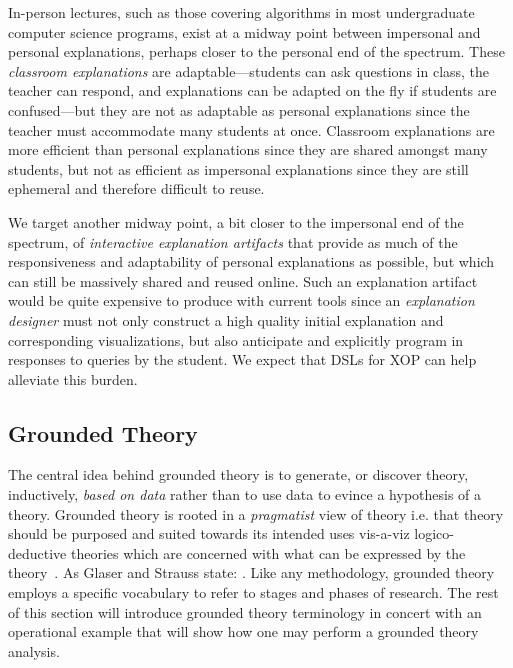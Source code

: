\documentclass[sigconf]{acmart}
\begin{document}
In-person lectures, such as those covering algorithms in most undergraduate
computer science programs, exist at a midway point between impersonal and
personal explanations, perhaps closer to the personal end of the spectrum.
These \emph{classroom explanations} are adaptable---students can ask questions
in class, the teacher can respond, and explanations can be adapted on the fly
if students are confused---but they are not as adaptable as personal
explanations since the teacher must accommodate many students at once.
Classroom explanations are more efficient than personal explanations since they
are shared amongst many students, but not as efficient as impersonal
explanations since they are still ephemeral and therefore difficult to reuse.


We target another midway point, a bit closer to the impersonal end of the
spectrum, of \emph{interactive explanation artifacts} that provide as much of
the responsiveness and adaptability of personal explanations as possible, but
which can still be massively shared and reused online. Such an explanation
artifact would be quite expensive to produce with current tools since an
\emph{explanation designer} must not only construct a high quality initial
explanation and corresponding visualizations, but also anticipate and
explicitly program in responses to queries by the student.
%
We expect that DSLs for XOP can help alleviate this burden.





\subsection{Grounded Theory}
\label{sec:back:gt}
The central idea behind grounded theory is to generate, or discover theory,
inductively, \emph{based on data} rather than to use data to evince a hypothesis
of a theory. Grounded theory is rooted in a \emph{pragmatist} view of theory
i.e. that theory should be purposed and suited towards its intended uses
vis-a-viz logico-deductive theories which are concerned with what can be
expressed by the theory~\cite{Strauss67discoveryof}. As Glaser and Strauss
state:
\newline
\newline
{}.
\newline
\newline
Like any methodology, grounded theory employs a specific vocabulary to refer to
stages and phases of research. The rest of this section will introduce grounded theory
terminology in concert with an operational example that will show how one may
perform a grounded theory analysis.
\end{document}
